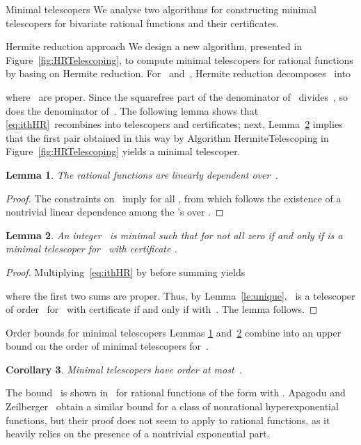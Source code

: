 \documentclass{sig-alt-full}
\newtheorem{lemma}{Lemma}
\newtheorem{cor}[lemma]{Corollary}
\begin{document}
\begin{section}{Minimal telescopers}\label{sec:minimal-order}
We analyse two algorithms for constructing minimal telescopers for
bivariate rational functions and their certificates.
\begin{subsection}{Hermite reduction approach}\label{HRA}
We design a new algorithm, presented in Figure~\ref{fig:HRTelescoping},
to compute minimal telescopers for rational functions by basing on
Hermite reduction. For~ and~, Hermite reduction
decomposes~ into

where~ are proper. Since the squarefree
part of the denominator of~ divides~, so does the
denominator of~.
The following lemma shows that \eqref{eq:ithHR}~recombines into
telescopers and certificates;
next, Lemma~\ref{le:minimaltele} implies that the first pair obtained in
this way by Algorithm \textsf{HermiteTelescoping}
in Figure~\ref{fig:HRTelescoping}
yields a minimal telescoper.

\begin{lemma}\label{le:bound}
The rational functions  are linearly dependent
over~.
\end{lemma}

\begin{proof}
The constraints on~ imply
 for all , from which
follows the existence of a nontrivial linear dependence among the
's over .
\end{proof}

\begin{lemma}\label{le:minimaltele}
An integer~ is minimal such that 
for  not all zero
if and only if
 is a minimal telescoper for~ with
certificate .
\end{lemma}

\begin{proof}
Multiplying~\eqref{eq:ithHR} by  before summing yields

where the first two sums are proper.
Thus, by Lemma~\ref{le:unique}, ~is a telescoper of order~ for~
with certificate 
if and only if  with~.
The lemma follows.
\end{proof}

\begin{subsubsection}{Order bounds for minimal telescopers}\label{se:lowerbound}
Lemmas \ref{le:bound} and~\ref{le:minimaltele} combine into an upper bound
on the order of minimal telescopers for~.
\begin{cor}\label{cor:upperbound}
Minimal telescopers have order at most~.
\end{cor}
The bound~ is shown in~\cite{BCLSS2007}
for rational functions of the form  with .
Apagodu and Zeilberger~\cite{Apagodu2006} obtain a similar bound for a
class of nonrational hyperexponential functions, but their proof does
not seem to apply to rational functions, as it heavily relies on the
presence of a nontrivial exponential part.


\end{subsubsection}
\end{subsection}
\end{section}
\end{document}
